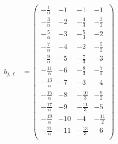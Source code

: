 \documentclass{article}
\begin{document}
\begin{align*}
b_{j,\ell} &= \left(
\begin{array}{cccc}
 -\frac{1}{\alpha } & -1 & -1 & -1 \\
 -\frac{3}{\alpha } & -2 & -\frac{4}{3} & -\frac{3}{2} \\
 -\frac{5}{\alpha } & -3 & -\frac{5}{3} & -2 \\
 -\frac{7}{\alpha } & -4 & -2 & -\frac{5}{2} \\
 -\frac{9}{\alpha } & -5 & -\frac{7}{3} & -3 \\
 -\frac{11}{\alpha } & -6 & -\frac{8}{3} & -\frac{7}{2} \\
 -\frac{13}{\alpha } & -7 & -3 & -4 \\
 -\frac{15}{\alpha } & -8 & -\frac{10}{3} & -\frac{9}{2} \\
 -\frac{17}{\alpha } & -9 & -\frac{11}{3} & -5 \\
 -\frac{19}{\alpha } & -10 & -4 & -\frac{11}{2} \\
 -\frac{21}{\alpha } & -11 & -\frac{13}{3} & -6 \\
\end{array}
\right)
\end{align*}
\end{document}
